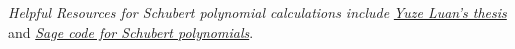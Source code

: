 \textit{Helpful Resources for Schubert polynomial calculations include}
\href{https://www.math.ucdavis.edu/~webfiles/undergrad_thesis/202003_Yuze_Luan_Carlsson_Thesis.pdf}{\textit{Yuze Luan's thesis}} and \href{https://doc.sagemath.org/html/en/reference/combinat/sage/combinat/schubert_polynomial.html}{\textit{Sage code for Schubert polynomials}}.